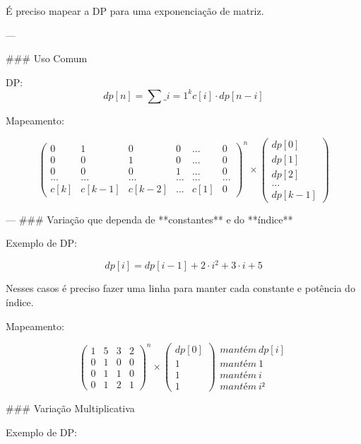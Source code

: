 \documentclass[11pt, a4paper, twoside]{article}
\begin{document}
É preciso mapear a DP para uma exponenciação de matriz.

---


\#\#\# Uso Comum

DP:   
$$ dp[n] = \sum\_{i=1}^{k} c[i] \cdot dp[n - i]$$ 

Mapeamento:   

$$ \begin{pmatrix} 0&1&0&0&...&0 \\ 0&0&1&0&...&0 \\ 0&0&0&1&...&0 \\ ...&...&...&...&...&... \\ c[k]&c[k-1]&c[k-2]&...&c[1]&0 \end{pmatrix}^n \times \begin{pmatrix} dp[0] \\ dp[1] \\ dp[2] \\ ... \\ dp[k-1] \end{pmatrix} $$

---
\#\#\# Variação que dependa de **constantes** e do **índice**

Exemplo de DP:   

$$ dp[i] = dp[i-1] + 2 \cdot i^2 + 3 \cdot i + 5 $$

Nesses casos é preciso fazer uma linha para manter cada constante e potência do índice.

Mapeamento:

$$
\begin{pmatrix} 1&5&3&2 \\ 0&1&0&0 \\ 0&1&1&0 \\ 0&1&2&1 \end{pmatrix}^n
\times
\begin{pmatrix} 
    dp[0]   \\
    1       \\
    1       \\
    1\end
{pmatrix} 
\begin{matrix} 
    mantém\ dp[i]   \\
    mantém\ 1       \\
    mantém\ i       \\
    mantém\ i²      \end
{matrix}
$$

\#\#\# Variação Multiplicativa

Exemplo de DP:
\end{document}
